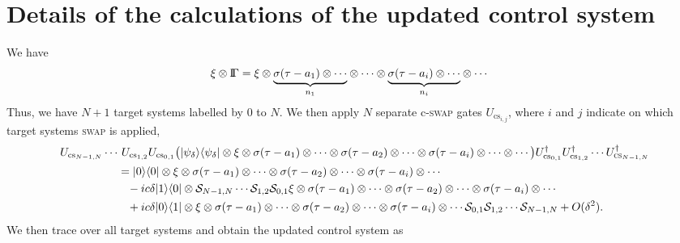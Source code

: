 \documentclass[aps,pra,twocolumn,floatfix,groupedaddress,superscriptaddress,nofootinbib,notitlepage]{revtex4-2}
\def\DSGamma{{\mathrm{I}\hskip-0.6mm\Gamma}}
\begin{document}
\section{Details of the calculations of the updated control system}
\label{app:updated-control}

We have 
\begin{align}
\xi \otimes \DSGamma & = \xi \otimes\underset{n_{1}}{\underbrace{\sigma(\tau-a_{1})\otimes\cdots}}\otimes \cdots \otimes \underset{n_{i}}{\underbrace{\sigma(\tau-a_{i})\otimes\cdots}}\otimes \cdots
\end{align}
Thus, we have $N+1$ target systems labelled by $0$ to $N$. We then apply $N$ separate c-\textsc{swap} gates $U_{\text{cs}_{i,j}}$, where $i$ and $j$ indicate on which target systems \textsc{swap} is applied,
\begin{align}
U_{\text{cs}_{N-1,N}}\cdots&\,\, U_{\text{cs}_{1,2}} U_{\text{cs}_{0,1}} \big(|\psi_{\delta}\rangle\langle \psi_{\delta}|\otimes \xi \otimes\sigma(\tau-a_{1}) \otimes\cdots \otimes \sigma(\tau-a_{2})\otimes \cdots \otimes 
\sigma(\tau-a_{i})\otimes\cdots
\otimes \cdots\big) U^{\dag}_{\text{cs}_{0,1}} U^{\dag}_{\text{cs}_{1,2}} \cdots U^{\dag}_{\textsc{cs}_{N-1,N}}
\nonumber\\
& = |0\rangle\langle 0| \otimes \xi \otimes \sigma(\tau-a_{1})\otimes\cdots\otimes 
\sigma(\tau-a_{2})\otimes\cdots \otimes \sigma(\tau-a_{i})\otimes\cdots \nonumber\\
& \,\,\,\,\, -ic\delta |1\rangle\langle 0|\otimes \mathcal{S}_{N-1,N} \cdots \mathcal{S}_{1,2} \mathcal{S}_{0,1} \xi \otimes \sigma(\tau-a_{1})\otimes\cdots\otimes \sigma(\tau-a_{2})\otimes\cdots \otimes \sigma(\tau-a_{i})\otimes\cdots \nonumber\\
& \,\,\,\,\, + ic\delta |0\rangle\langle 1|\otimes \xi \otimes \sigma(\tau-a_{1})\otimes\cdots\otimes \sigma(\tau-a_{2})\otimes\cdots \otimes  \sigma(\tau-a_{i}) \otimes \cdots \mathcal{S}_{0,1} \mathcal{S}_{1,2}\cdots \mathcal{S}_{N-1,N} + O(\delta^{2}).
\end{align}
We then trace over all target systems and obtain the updated control system as 
\end{document}
